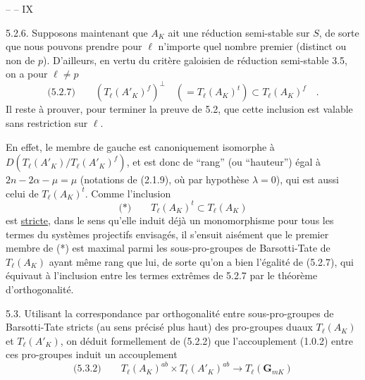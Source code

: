 \hfill --  -- \hfill IX

5.2.6. Supposons maintenant que $A_K$ ait une réduction semi-stable sur $S$, de sorte que nous pouvons prendre pour $\ell$ n'importe quel nombre premier (distinct ou non de $p$). D'ailleurs, en vertu du critère galoisien de réduction semi-stable 3.5, on a pour $\ell\neq p$
\[
\text{(5.2.7)}\qquad (T_\ell(A'_K)^f)^\perp\quad (=T_\ell(A_K)^t)\subset T_\ell(A_K)^f\quad .
\]
Il reste à prouver, pour terminer la preuve de 5.2, que cette inclusion est valable sans restriction sur $\ell$.

En effet, le membre de gauche est canoniquement isomorphe à $D(T_\ell(A'_K)/T_\ell(A'_K)^f)$, et est donc de ``rang'' (ou ``hauteur'') égal à $2n-2\alpha-\mu=\mu$ (notations de (2.1.9), où par hypothèse $\lambda=0$), qui est aussi celui de $T_\ell(A_K)^t$. Comme l'inclusion
\[
\text{(*)}\qquad T_\ell(A_K)^t\subset T_\ell(A_K)
\]
est \uline{stricte}, dans le sens qu'elle induit déjà un monomorphisme pour tous les termes du systèmes projectifs envisagés, il s'ensuit aisément que le premier membre de (*) est maximal parmi les sous-pro-groupes de Barsotti-Tate de $T_\ell(A_K)$ ayant même rang que lui, de sorte qu'on a bien l'égalité de (5.2.7), qui équivaut à l'inclusion entre les termes extrêmes de 5.2.7 par le théorème d'orthogonalité.

5.3. Utilisant la correspondance par orthogonalité entre sous-pro-groupes de Barsotti-Tate stricts (au sens précisé plus haut) des pro-groupes duaux $T_\ell(A_K)$ et $T_\ell(A'_K)$, on déduit formellement de (5.2.2) que l'accouplement (1.0.2) entre ces pro-groupes induit un accouplement
\[
\text{(5.3.2)}\qquad T_\ell(A_K)^{ab}\times T_\ell(A'_K)^{ab}\longrightarrow T_\ell(\mathbf G_{mK})
\]

